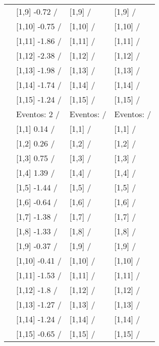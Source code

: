\begin{table}
\begin{tabular}[t]{llll}
\addlinespace
 & {}[1,9] -0.72  / & {}[1,9]  / & {}[1,9]  /\\
 & {}[1,10] -0.75  / & {}[1,10]  / & {}[1,10]  /\\
 & {}[1,11] -1.86  / & {}[1,11]  / & {}[1,11]  /\\
 & {}[1,12] -2.38  / & {}[1,12]  / & {}[1,12]  /\\
 & {}[1,13] -1.98  / & {}[1,13]  / & {}[1,13]  /\\
\addlinespace
 & {}[1,14] -1.74  / & {}[1,14]  / & {}[1,14]  /\\
 & {}[1,15] -1.24  / & {}[1,15]  / & {}[1,15]  /\\
 & Eventos:  2 / & Eventos:   / & Eventos:   /\\
 & {}[1,1] 0.14  / & {}[1,1]  / & {}[1,1]  /\\
 & {}[1,2] 0.26  / & {}[1,2]  / & {}[1,2]  /\\
\addlinespace
 & {}[1,3] 0.75  / & {}[1,3]  / & {}[1,3]  /\\
 & {}[1,4] 1.39  / & {}[1,4]  / & {}[1,4]  /\\
 & {}[1,5] -1.44  / & {}[1,5]  / & {}[1,5]  /\\
 & {}[1,6] -0.64  / & {}[1,6]  / & {}[1,6]  /\\
 & {}[1,7] -1.38  / & {}[1,7]  / & {}[1,7]  /\\
\addlinespace
500 & {}[1,8] -1.33  / & {}[1,8]  / & {}[1,8]  /\\
 & {}[1,9] -0.37  / & {}[1,9]  / & {}[1,9]  /\\
 & {}[1,10] -0.41  / & {}[1,10]  / & {}[1,10]  /\\
 & {}[1,11] -1.53  / & {}[1,11]  / & {}[1,11]  /\\
 & {}[1,12] -1.8  / & {}[1,12]  / & {}[1,12]  /\\
\addlinespace
 & {}[1,13] -1.27  / & {}[1,13]  / & {}[1,13]  /\\
 & {}[1,14] -1.24  / & {}[1,14]  / & {}[1,14]  /\\
 & {}[1,15] -0.65  / & {}[1,15]  / & {}[1,15]  /\\
\bottomrule
\end{tabular}
\end{table}
